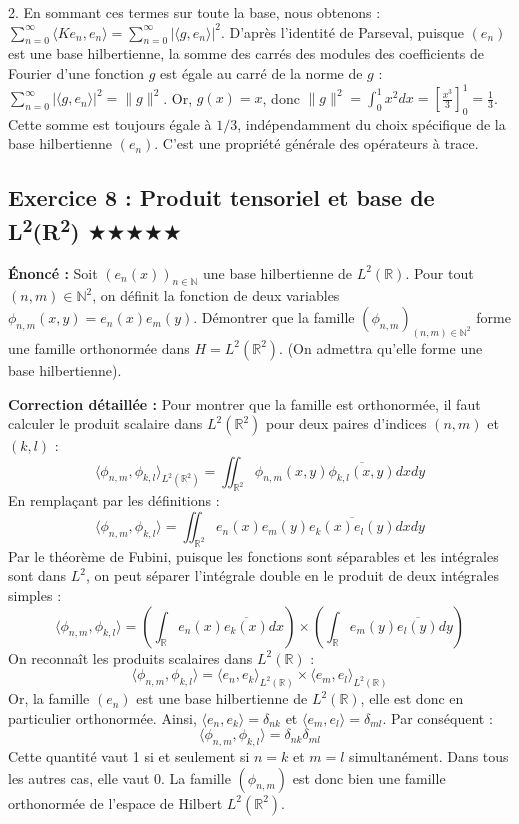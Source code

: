 \documentclass[11pt,a4paper]{article}
\begin{document}
2. En sommant ces termes sur toute la base, nous obtenons :
   $\sum_{n=0}^\infty \langle K e_n, e_n \rangle = \sum_{n=0}^\infty |\langle g, e_n \rangle|^2$.
   D'après l'identité de Parseval, puisque $(e_n)$ est une base hilbertienne, la somme des carrés des modules des coefficients de Fourier d'une fonction $g$ est égale au carré de la norme de $g$ :
   $\sum_{n=0}^\infty |\langle g, e_n \rangle|^2 = \|g\|^2$.
   Or, $g(x) = x$, donc $\|g\|^2 = \int_0^1 x^2 dx = \left[ \frac{x^3}{3} \right]_0^1 = \frac{1}{3}$.
   Cette somme est toujours égale à $1/3$, indépendamment du choix spécifique de la base hilbertienne $(e_n)$. C'est une propriété générale des opérateurs à trace.


\subsection*{Exercice 8 : Produit tensoriel et base de L\textsuperscript{2}(R\textsuperscript{2}) $\bigstar\bigstar\bigstar\bigstar\bigstar$}

\textbf{Énoncé :}
Soit $(e_n(x))_{n \in \mathbb{N}}$ une base hilbertienne de $L^2(\mathbb{R})$.
Pour tout $(n, m) \in \mathbb{N}^2$, on définit la fonction de deux variables $\phi_{n,m}(x,y) = e_n(x) e_m(y)$.
Démontrer que la famille $(\phi_{n,m})_{(n,m) \in \mathbb{N}^2}$ forme une famille orthonormée dans $H = L^2(\mathbb{R}^2)$. (On admettra qu'elle forme une base hilbertienne).

\textbf{Correction détaillée :}
Pour montrer que la famille est orthonormée, il faut calculer le produit scalaire dans $L^2(\mathbb{R}^2)$ pour deux paires d'indices $(n, m)$ et $(k, l)$ :
$$ \langle \phi_{n,m}, \phi_{k,l} \rangle_{L^2(\mathbb{R}^2)} = \iint_{\mathbb{R}^2} \phi_{n,m}(x,y) \overline{\phi_{k,l}(x,y)} dx dy $$
En remplaçant par les définitions :
$$ \langle \phi_{n,m}, \phi_{k,l} \rangle = \iint_{\mathbb{R}^2} e_n(x) e_m(y) \overline{e_k(x) e_l(y)} dx dy $$
Par le théorème de Fubini, puisque les fonctions sont séparables et les intégrales sont dans $L^2$, on peut séparer l'intégrale double en le produit de deux intégrales simples :
$$ \langle \phi_{n,m}, \phi_{k,l} \rangle = \left( \int_{\mathbb{R}} e_n(x) \overline{e_k(x)} dx \right) \times \left( \int_{\mathbb{R}} e_m(y) \overline{e_l(y)} dy \right) $$
On reconnaît les produits scalaires dans $L^2(\mathbb{R})$ :
$$ \langle \phi_{n,m}, \phi_{k,l} \rangle = \langle e_n, e_k \rangle_{L^2(\mathbb{R})} \times \langle e_m, e_l \rangle_{L^2(\mathbb{R})} $$
Or, la famille $(e_n)$ est une base hilbertienne de $L^2(\mathbb{R})$, elle est donc en particulier orthonormée.
Ainsi, $\langle e_n, e_k \rangle = \delta_{nk}$ et $\langle e_m, e_l \rangle = \delta_{ml}$.
Par conséquent :
$$ \langle \phi_{n,m}, \phi_{k,l} \rangle = \delta_{nk} \delta_{ml} $$
Cette quantité vaut 1 si et seulement si $n = k$ et $m = l$ simultanément. Dans tous les autres cas, elle vaut 0.
La famille $(\phi_{n,m})$ est donc bien une famille orthonormée de l'espace de Hilbert $L^2(\mathbb{R}^2)$.
\end{document}
